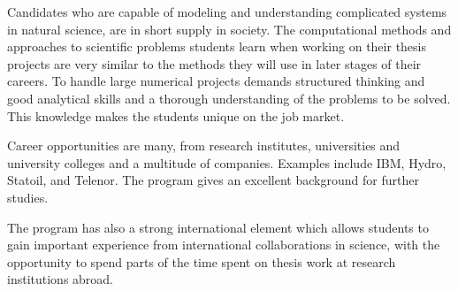 \documentclass[%
oneside,                 %
final,                   %
10pt]{article}
\begin{document}
Candidates who are capable of modeling and understanding complicated
systems in natural science, are in short supply in society.  The
computational methods and approaches to scientific problems students learn
when working on their thesis projects are very similar to the methods
they will use in later stages of their careers.  To handle large
numerical projects demands structured thinking and good analytical
skills and a thorough understanding of the problems to be solved. This
knowledge makes the students unique on the job market.

Career opportunities are many, from research institutes, universities
and university colleges and a multitude of companies. Examples
include IBM, Hydro, Statoil, and Telenor.  The program gives an
excellent background for further studies.

The program has also a strong international element which allows students to
gain important experience from international collaborations in
science, with the opportunity to spend parts of the time spent on
thesis work at research institutions abroad.


\end{document}
